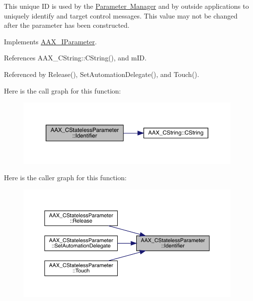 This unique ID is used by the \mbox{\hyperlink{a00814}{Parameter Manager}} and by outside applications to uniquely identify and target control messages. This value may not be changed after the parameter has been constructed. 

Implements \mbox{\hyperlink{a01857_a28807db424a720daa9880ed9ee5d4d21}{A\+A\+X\+\_\+\+I\+Parameter}}.



References A\+A\+X\+\_\+\+C\+String\+::\+C\+String(), and m\+ID.



Referenced by Release(), Set\+Automation\+Delegate(), and Touch().

Here is the call graph for this function\+:
\nopagebreak
\begin{figure}[H]
\begin{center}
\leavevmode
\includegraphics[width=350pt]{a01541_a9ab991e0bad2bc76b7efba3d129f1953_cgraph}
\end{center}
\end{figure}
Here is the caller graph for this function\+:
\nopagebreak
\begin{figure}[H]
\begin{center}
\leavevmode
\includegraphics[width=350pt]{a01541_a9ab991e0bad2bc76b7efba3d129f1953_icgraph}
\end{center}
\end{figure}
\mbox{\label{a01541_ada71762c3254475a587047b50efbead5}} 
